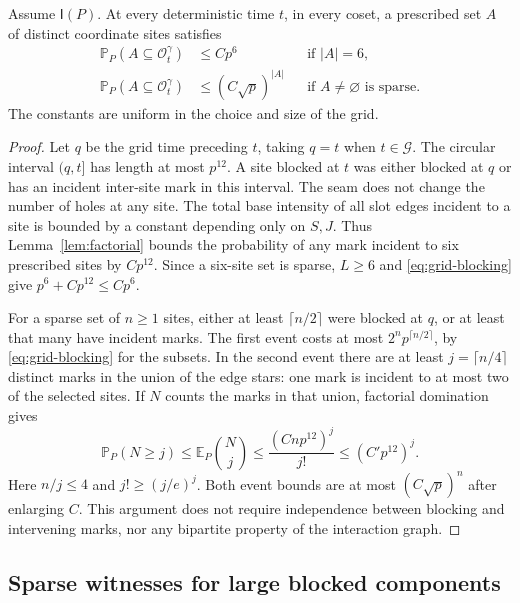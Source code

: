 \begin{lemma}\label{lem:blocking}
Assume \(\mathsf I(P)\).  At every deterministic time \(t\), in
every coset, a prescribed set \(A\) of distinct coordinate sites
satisfies
\begin{align}
 \mathbb P_P(A\subseteq\mathcal O_t^\gamma)&\le Cp^6
 &&\text{if }|A|=6,\label{eq:six-blocking}\\
 \mathbb P_P(A\subseteq\mathcal O_t^\gamma)&\le(C\sqrt p)^{|A|}
 &&\text{if }A\ne\varnothing\text{ is sparse}.
 \label{eq:sparse-blocking}
\end{align}
The constants are uniform in the choice and size of the grid.
\end{lemma}

\begin{proof}
Let \(q\) be the grid time preceding \(t\), taking \(q=t\) when
\(t\in\mathcal G\).  The circular interval \((q,t]\) has length
at most \(p^{12}\).  A site blocked at \(t\) was either blocked
at \(q\) or has an incident inter-site mark in this interval.
The seam does not change the number of holes at any site.  The
total base intensity of all slot edges incident to a site is bounded
by a constant depending only on \(S,J\).  Thus Lemma~\ref{lem:factorial}
bounds the probability of any mark incident to six prescribed sites
by \(Cp^{12}\).  Since a six-site set is sparse, \(L\ge6\) and
\eqref{eq:grid-blocking} give \(p^6+Cp^{12}\le Cp^6\).

For a sparse set of \(n\ge1\) sites, either at least
\(\lceil n/2\rceil\) were blocked at \(q\), or at least that
many have incident marks.  The first event costs at most
\(2^np^{\lceil n/2\rceil}\), by \eqref{eq:grid-blocking} for the
subsets.  In the second event there are at least
\(j=\lceil n/4\rceil\) distinct marks in the union of the edge
stars: one mark is incident to at most two of the selected sites.
If \(N\) counts the marks in that union, factorial domination gives
\[
 \mathbb P_P(N\ge j)
 \le\mathbb E_P\binom Nj
 \le\frac{(Cnp^{12})^j}{j!}
 \le(C'p^{12})^j.
\]
Here \(n/j\le4\) and \(j!\ge(j/e)^j\).  Both event bounds are
at most \((C\sqrt p)^n\) after enlarging \(C\).  This argument
does not require independence between blocking and intervening marks,
nor any bipartite property of the interaction graph.
\end{proof}

\subsection{Sparse witnesses for large blocked components}

